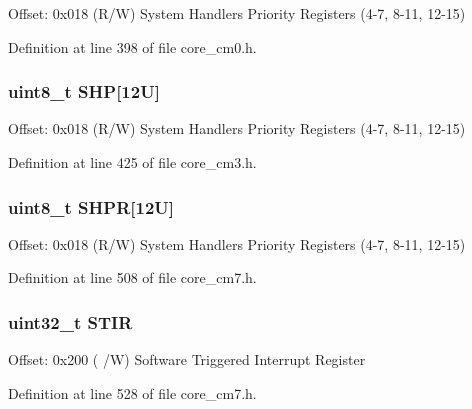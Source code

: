 Offset\+: 0x018 (R/W) System Handlers Priority Registers (4-\/7, 8-\/11, 12-\/15) 

Definition at line 398 of file core\+\_\+cm0.\+h.

\subsubsection[{\texorpdfstring{S\+HP}{SHP}}]{ uint8\+\_\+t S\+HP\mbox{[}12\+U\mbox{]}}\hypertarget{struct_s_c_b___type_a293826a2c44f754e80af03d62f62f9e6}{}\label{struct_s_c_b___type_a293826a2c44f754e80af03d62f62f9e6}
Offset\+: 0x018 (R/W) System Handlers Priority Registers (4-\/7, 8-\/11, 12-\/15) 

Definition at line 425 of file core\+\_\+cm3.\+h.

\subsubsection[{\texorpdfstring{S\+H\+PR}{SHPR}}]{ uint8\+\_\+t S\+H\+PR\mbox{[}12\+U\mbox{]}}\hypertarget{struct_s_c_b___type_a49f5a554705aebf542765b3a38f4feb9}{}\label{struct_s_c_b___type_a49f5a554705aebf542765b3a38f4feb9}
Offset\+: 0x018 (R/W) System Handlers Priority Registers (4-\/7, 8-\/11, 12-\/15) 

Definition at line 508 of file core\+\_\+cm7.\+h.

\subsubsection[{\texorpdfstring{S\+T\+IR}{STIR}}]{ uint32\+\_\+t S\+T\+IR}\hypertarget{struct_s_c_b___type_ada9cbba14ab1cc3fddd585f870932db8}{}\label{struct_s_c_b___type_ada9cbba14ab1cc3fddd585f870932db8}
Offset\+: 0x200 ( /W) Software Triggered Interrupt Register 

Definition at line 528 of file core\+\_\+cm7.\+h.

